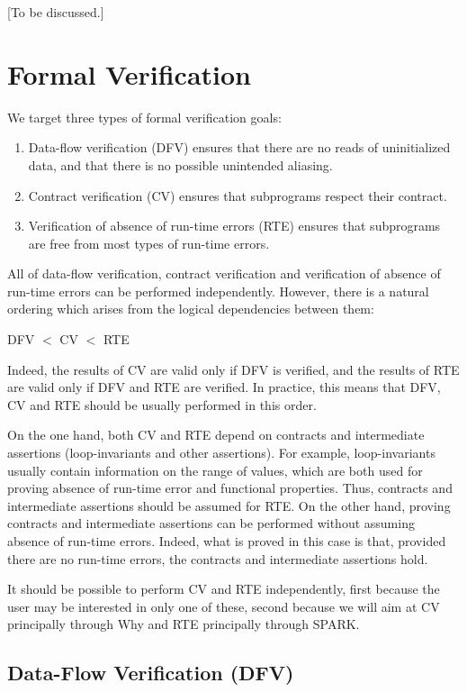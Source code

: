 \documentclass{article}
\newcounter{example}
\begin{document}
[To be discussed.]

\section{Formal Verification}
\label{sec:formal-verification}

We target three types of formal verification goals:
\begin{enumerate}
\item Data-flow verification (DFV) ensures that there are no reads of
  uninitialized data, and that there is no possible unintended aliasing.
\item Contract verification (CV) ensures that subprograms respect their
  contract.
\item Verification of absence of run-time errors (RTE) ensures that subprograms
  are free from most types of run-time errors.
\end{enumerate}

All of data-flow verification, contract verification and verification of
absence of run-time errors can be performed independently. However, there is a
natural ordering which arises from the logical dependencies between them: 
\begin{center}
  DFV $<$ CV $<$ RTE
\end{center}

Indeed, the results of CV are valid only if DFV is verified, and the results of
RTE are valid only if DFV and RTE are verified. In practice, this means that
DFV, CV and RTE should be usually performed in this order.

On the one hand, both CV and RTE depend on contracts and intermediate
assertions (loop-invariants and other assertions). For example, loop-invariants
usually contain information on the range of values, which are both used for
proving absence of run-time error and functional properties. Thus, contracts
and intermediate assertions should be assumed for RTE. On the other hand,
proving contracts and intermediate assertions can be performed without assuming
absence of run-time errors. Indeed, what is proved in this case is that,
provided there are no run-time errors, the contracts and intermediate
assertions hold.

It should be possible to perform CV and RTE independently, first because the
user may be interested in only one of these, second because we will aim at CV
principally through Why and RTE principally through SPARK.

\subsection{Data-Flow Verification (DFV)}
\label{sub:DFV}
\end{document}

